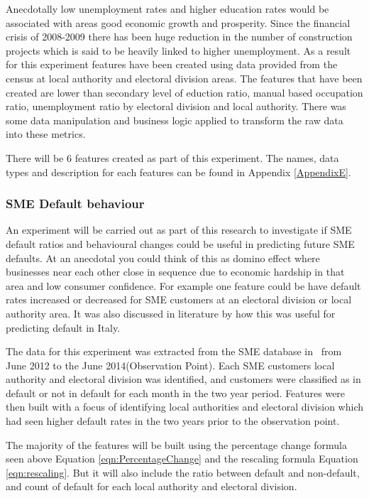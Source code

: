 Anecdotally low unemployment rates and higher education rates would be associated with areas good economic growth and prosperity. Since the financial crisis of 2008-2009 there has been huge reduction in the number of construction projects which is said to be heavily linked to higher unemployment. As a result for this experiment features have been created using data provided from the census at local authority and electoral division areas. The features that have been created are lower than secondary level of eduction ratio, manual based occupation ratio, unemployment ratio by electoral division and local authority. There was some data manipulation and business logic applied to transform the raw data into these metrics.

There will be 6 features created as part of this experiment. The names, data types and description for each features can be found in Appendix \ref{AppendixE}.



\subsubsection{SME Default behaviour}
An experiment will be carried out as part of this research to investigate if SME default ratios and behavioural changes could be useful in predicting future SME defaults. At an anecdotal you could think of this as domino effect where businesses near each other close in sequence due to economic hardship in that area and low consumer confidence. For example one feature could be have default rates increased or decreased for SME customers at an electoral division or local authority area. It was also discussed in literature by \cite{di_pietro_regional} how this was useful for predicting default in Italy. 

The data for this experiment was extracted from the SME database in \subjectname\ from June 2012 to the June 2014(Observation Point). Each SME customers local authority and electoral division was identified, and customers were classified as in default or not in default for each month in the two year period. Features were then built with a focus of identifying local authorities and electoral division which had seen higher default rates in the two years prior to the observation point. 

The majority of the features will be built using the percentage change formula seen above Equation \ref{eqn:PercentageChange} and the rescaling formula Equation \ref{eqn:rescaling}. But it will also include the ratio between default and non-default, and count of default for each local authority and electoral division.

